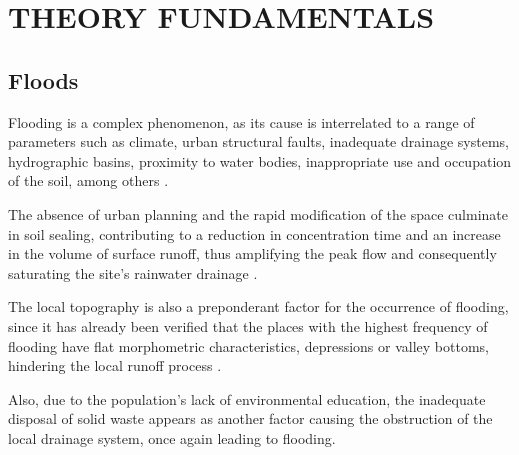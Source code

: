 \chapter{THEORY FUNDAMENTALS}\label{Rev}


\section{Floods}\label{flood}

Flooding is a complex phenomenon, as its cause is interrelated to a range of parameters such as climate, urban structural faults, inadequate drainage systems, hydrographic basins, proximity to water bodies, inappropriate use and occupation of the soil, among others \cite{doocy2013human}.

The absence of urban planning and the rapid modification of the space culminate in soil sealing, contributing to a reduction in concentration time and an increase in the volume of surface runoff, thus amplifying the peak flow and consequently saturating the site's rainwater drainage \cite{hansmann2013descriccao}.

The local topography is also a preponderant factor for the occurrence of flooding, since it has already been verified that the places with the highest frequency of flooding have flat morphometric characteristics, depressions or valley bottoms, hindering the local runoff process \cite{braga2016alagamentos}.

Also, due to the population's lack of environmental education, the inadequate disposal of solid waste appears as another factor causing the obstruction of the local drainage system, once again leading to flooding.




